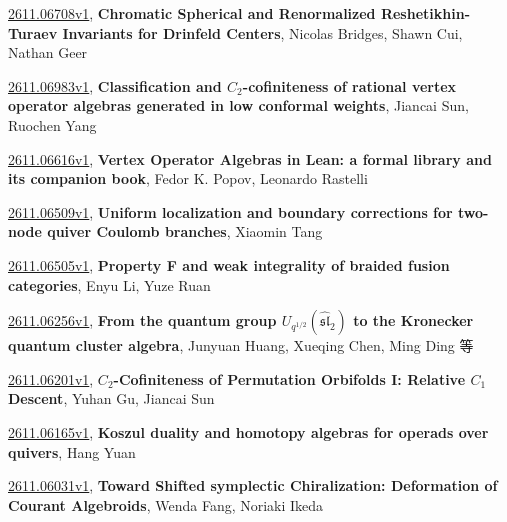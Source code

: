 \documentclass[9pt, a4paper]{article}
\theoremstyle{plain}
\theoremstyle{definition}
\theoremstyle{remark}
\newcommand{\arxiv}[3]{\href{https://arxiv.org/abs/#1}{#1}, \textbf{\textcolor{arxivblue}{#2}}, #3}
\begin{document}
\arxiv{2611.06708v1}{Chromatic Spherical and Renormalized Reshetikhin-Turaev Invariants for Drinfeld Centers}{Nicolas Bridges, Shawn Cui, Nathan Geer}

\arxiv{2611.06983v1}{Classification and $C_2$-cofiniteness of rational vertex operator algebras generated in low conformal weights}{Jiancai Sun, Ruochen Yang}

\arxiv{2611.06616v1}{Vertex Operator Algebras in Lean: a formal library and its companion book}{Fedor K. Popov, Leonardo Rastelli}

\arxiv{2611.06509v1}{Uniform localization and boundary corrections for two-node quiver Coulomb branches}{Xiaomin Tang}

\arxiv{2611.06505v1}{Property F and weak integrality of braided fusion categories}{Enyu Li, Yuze Ruan}

\arxiv{2611.06256v1}{From the quantum group $U_{q^{1/2}}( {\widehat {\mathfrak{sl}}}_2 )$ to the Kronecker quantum cluster algebra}{Junyuan Huang, Xueqing Chen, Ming Ding 等}

\arxiv{2611.06201v1}{$C_2$-Cofiniteness of Permutation Orbifolds I: Relative $C_1$ Descent}{Yuhan Gu, Jiancai Sun}

\arxiv{2611.06165v1}{Koszul duality and homotopy algebras for operads over quivers}{Hang Yuan}

\arxiv{2611.06031v1}{Toward Shifted symplectic Chiralization: Deformation of Courant Algebroids}{Wenda Fang, Noriaki Ikeda}

\end{document}
